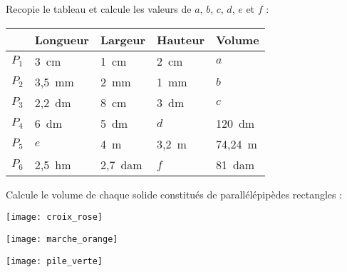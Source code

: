 \begin{exercice}
Recopie le tableau et calcule les valeurs de $a$, $b$, $c$, $d$, $e$ et $f$ :
\begin{center}
 \begin{tabularx}{\linewidth}{|c|*{4}{>{\centering\arraybackslash}X|}}
 \hline
 & \cellcolor{H2} Longueur & \cellcolor{H2} Largeur & \cellcolor{H2} Hauteur & \cellcolor{H2} Volume \\\hline
 \cellcolor{U1} $P_1$ & \cellcolor{H3} 3 cm & \cellcolor{H3} 1 cm & \cellcolor{H3} 2 cm & \cellcolor{H3} $a$ \\\hline
 \cellcolor{U1} $P_2$ & \cellcolor{H3} 3,5 mm & \cellcolor{H3} 2 mm & \cellcolor{H3} 1 mm & \cellcolor{H3} $b$ \\\hline
 \cellcolor{U1} $P_3$ & \cellcolor{H3} 2,2 dm & \cellcolor{H3} 8 cm & \cellcolor{H3} 3 dm & \cellcolor{H3} $c$ \\\hline
 \cellcolor{U1} $P_4$ & \cellcolor{H3} 6 dm & \cellcolor{H3} 5 dm & \cellcolor{H3} $d$ & \cellcolor{H3} 120 dm\up{3} \\\hline
 \cellcolor{U1} $P_5$ & \cellcolor{H3} $e$ & \cellcolor{H3} 4 m & \cellcolor{H3} 3,2 m & \cellcolor{H3} 74,24 m\up{3} \\\hline
 \cellcolor{U1} $P_6$ & \cellcolor{H3} 2,5 hm & \cellcolor{H3} 2,7 dam & \cellcolor{H3} $f$ & \cellcolor{H3} 81 dam\up{3} \\\hline
 \end{tabularx}
 \end{center}
\end{exercice}


\begin{exercice}
Calcule le volume de chaque solide constitués de parallélépipèdes rectangles :
\begin{colenumerate}{2}
 \item 
 
 \texttt{[image: croix\_rose]}
 \item 
 
 \texttt{[image: marche\_orange]}
 \item 
 
 \texttt{[image: pile\_verte]}

 \end{colenumerate}
\end{exercice}


